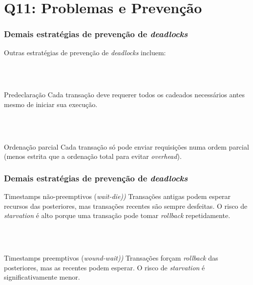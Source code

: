 \documentclass{beamer}
\begin{document}
\section{Q11: Problemas e Prevenção}


\begin{frame}
    \frametitle{Demais estratégias de prevenção de \emph{deadlocks}}
    Outras estratégias de prevenção de \emph{deadlocks} incluem:

    \\~\\
    \begin{block}{Predeclaração}
        Cada transação deve requerer todos os cadeados necessários antes mesmo de iniciar sua execução.
    \end{block}

    \\~\\
    \begin{block}{Ordenação parcial}
        Cada transação só pode enviar requisições numa ordem parcial (menos estrita que a ordenação total para evitar \emph{overhead}).
    \end{block}
\end{frame}

\begin{frame}
    \frametitle{Demais estratégias de prevenção de \emph{deadlocks}}
    
    \begin{block}{Timestamps não-preemptivos (\emph{wait-die))}}
        Transações antigas podem esperar recursos das posteriores, mas transações recentes são sempre desfeitas. O risco de \emph{starvation} é alto porque uma transação pode tomar \emph{rollback} repetidamente.
    \end{block}

    \\~\\
    \begin{block}{Timestamps preemptivos (\emph{wound-wait))}}
        Transações forçam \emph{rollback} das posteriores, mas as recentes podem esperar. O risco de \emph{starvation} é significativamente menor.
    \end{block}

\end{frame}
\end{document}
